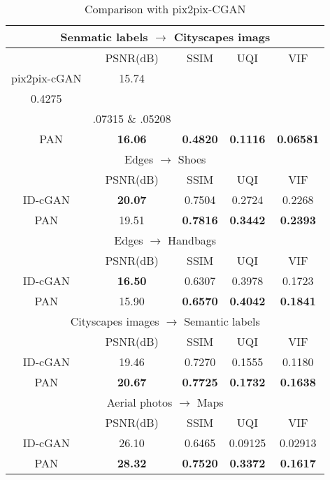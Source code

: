 \documentclass{article}
\begin{document}
\begin{table}[!t]
\renewcommand{\arraystretch}{1.3}
\caption{Comparison with pix2pix-CGAN}
\label{table:pix2pix}
\centering
\begin{tabular}{|c|c|c|c|c|}

\multicolumn{5}{c}{Senmatic labels $\to$ Cityscapes imags}  \\
\hline
 & PSNR(dB) & SSIM & UQI & VIF \\
\hline
\hline
  pix2pix-cGAN & 15.74  & \\0.4275 \\& \0.07315 \& \0.05208 \\\
\hline
 PAN & {\bf 16.06} & {\bf 0.4820} & {\bf 0.1116} & {\bf 0.06581} \\

\hline
\multicolumn{5}{c}{Edges $\to$  Shoes} \\
\hline
 & PSNR(dB) & SSIM & UQI & VIF \\
\hline
\hline
 ID-cGAN & {\bf 20.07} & 0.7504 & 0.2724 & 0.2268 \\
\hline
 PAN & 19.51 & {\bf 0.7816} & {\bf 0.3442} & {\bf 0.2393}\\

\hline
\multicolumn{5}{c}{Edges $\to$  Handbags} \\
\hline
 & PSNR(dB) & SSIM & UQI & VIF \\
\hline
\hline
 ID-cGAN & {\bf 16.50} & 0.6307 & 0.3978 & 0.1723\\
\hline
 PAN & 15.90 & {\bf 0.6570} & {\bf 0.4042} & {\bf 0.1841} \\
\hline
\multicolumn{5}{c}{Cityscapes images $\to$  Semantic labels} \\
\hline
 & PSNR(dB) & SSIM & UQI & VIF \\
\hline
\hline
 ID-cGAN & 19.46 & 0.7270 & 0.1555 & 0.1180\\
\hline
 PAN & {\bf 20.67} & {\bf 0.7725} & {\bf 0.1732} & {\bf 0.1638}\\
\hline
\multicolumn{5}{c}{Aerial photos $\to$  Maps} \\
\hline
 & PSNR(dB) & SSIM & UQI & VIF \\
\hline
\hline
 ID-cGAN & 26.10 & 0.6465 & 0.09125 & 0.02913\\
\hline
 PAN & {\bf 28.32} & {\bf 0.7520} & {\bf 0.3372} & {\bf 0.1617} \\
\hline
\end{tabular}
\end{table}
\end{document}
